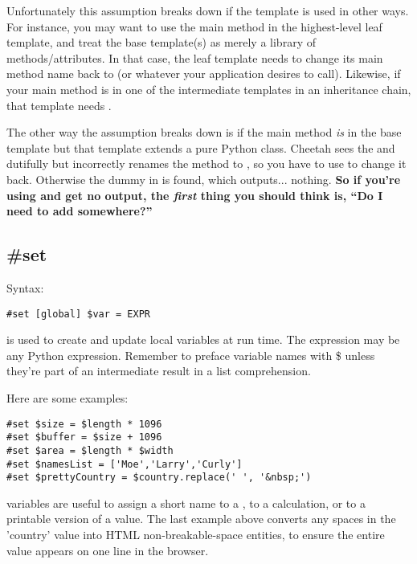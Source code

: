 Unfortunately this assumption breaks down if the template is used in other
ways.  For instance, you may want to use the main method in the highest-level
leaf template, and treat the base template(s) as merely a library of
methods/attributes.  In that case, the leaf template needs  to change its main method name back to  (or whatever
your application desires to call).  Likewise, if your main method is in one of the
intermediate templates in an inheritance chain, that template needs
.

The other way the assumption breaks down is if the main method {\em is} in
the base template but that template extends a pure Python class.  Cheetah sees
the  and dutifully but incorrectly renames the method to
, so you have to use  to change
it back.  Otherwise the dummy  in 
is found, which outputs...  nothing.  {\bf So if you're using 
and get no output, the {\em first} thing you should think is, ``Do I need to
add  somewhere?'' }




\subsection{\#set}
\label{inheritanceEtc.set}

Syntax:
\begin{verbatim}
#set [global] $var = EXPR
\end{verbatim}

 is used to create and update local variables at run time.
The expression may be any Python expression.
Remember to preface variable names with \$ unless they're part of an
intermediate result in a list comprehension.

Here are some examples:
\begin{verbatim}
#set $size = $length * 1096
#set $buffer = $size + 1096
#set $area = $length * $width
#set $namesList = ['Moe','Larry','Curly']
#set $prettyCountry = $country.replace(' ', '&nbsp;')
\end{verbatim}

 variables are useful to assign a short name to a
, to a calculation, or to a printable version of
a value.  The last example above converts any spaces in the 'country' value
into HTML non-breakable-space entities, to ensure the entire value appears on
one line in the browser.

